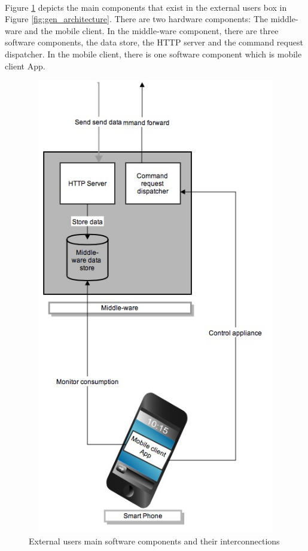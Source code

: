 \documentclass[12pt,a4paper,final]{report}
\begin{document}
\paragraph{}
Figure \ref{fig:part3} depicts the main components that exist in the external users box in Figure \ref{fig:gen_architecture}. There are two hardware components: The middle-ware and the mobile client. In the middle-ware component, there are three software components, the data store, the HTTP server and the command request dispatcher. In the mobile client, there is one software component which is mobile client App.
\begin{figure}[htbp]
\centering
\includegraphics[width=17cm,height=20cm,keepaspectratio]{img/part3.jpg}
\caption{External users main software components and their interconnections}
\label{fig:part3}
\end{figure}
\end{document}

